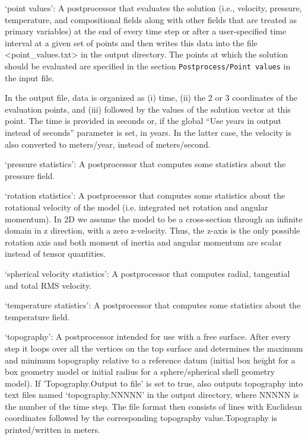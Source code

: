 \begin{itemize}
`point values': A postprocessor that evaluates the solution (i.e., velocity, pressure, temperature, and compositional fields along with other fields that are treated as primary variables) at the end of every time step or after a user-specified time interval at a given set of points and then writes this data into the file <point\_values.txt> in the output directory. The points at which the solution should be evaluated are specified in the section \texttt{Postprocess/Point values} in the input file.

In the output file, data is organized as (i) time, (ii) the 2 or 3 coordinates of the evaluation points, and (iii) followed by the values of the solution vector at this point. The time is provided in seconds or, if the global ``Use years in output instead of seconds'' parameter is set, in years. In the latter case, the velocity is also converted to meters/year, instead of meters/second.


`pressure statistics': A postprocessor that computes some statistics about the pressure field.

`rotation statistics': A postprocessor that computes some statistics about the rotational velocity of the model (i.e. integrated net rotation and angular momentum). In 2D we assume the model to be a cross-section through an infinite domain in z direction, with a zero z-velocity. Thus, the z-axis is the only possible rotation axis and both moment of inertia and angular momentum are scalar instead of tensor quantities.

`spherical velocity statistics': A postprocessor that computes radial, tangential and total RMS velocity.

`temperature statistics': A postprocessor that computes some statistics about the temperature field.

`topography': A postprocessor intended for use with a free surface.  After every step it loops over all the vertices on the top surface and determines the maximum and minimum topography relative to a reference datum (initial box height for a box geometry model or initial radius for a sphere/spherical shell geometry model). If 'Topography.Output to file' is set to true, also outputs topography into text files named `topography.NNNNN' in the output directory, where NNNNN is the number of the time step.
The file format then consists of lines with Euclidean coordinates followed by the corresponding topography value.Topography is printed/written in meters.


\end{itemize}
